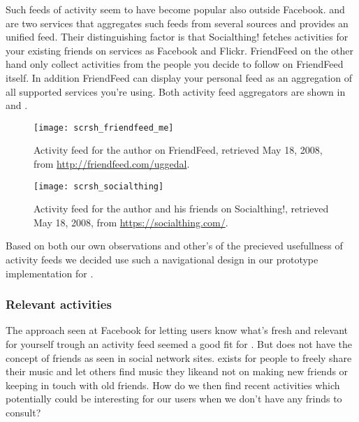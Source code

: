 Such feeds of activity seem to have become popular also outside Facebook.
 and  are two services that
aggregates such feeds from several sources and provides an unified feed. Their
distinguishing factor is that Socialthing! fetches activities for your
existing friends on services as Facebook and Flickr. FriendFeed on the other
hand only collect activities from the people you decide to follow on
FriendFeed itself. In addition FriendFeed can display your personal feed
as an aggregation of all supported services you're using. Both activity feed
aggregators are shown in  and
.

\begin{figure}
  \begin{whole}
    \texttt{[image: scrsh\_friendfeed\_me]}
    \caption[FriendFeed Activity Feed]{
      Activity feed for the author on FriendFeed,
      retrieved May 18, 2008, from
      \url{http://friendfeed.com/uggedal}.
    }
    \label{figure:scrsh.friendfeed.me}
  \end{whole}
\end{figure}

\begin{figure}
  \begin{whole}
    \texttt{[image: scrsh\_socialthing]}
    \caption[Socialthing! Activity Feed]{
      Activity feed for the author and his friends on Socialthing!,
      retrieved May 18, 2008, from
      \url{https://socialthing.com/}.
    }
    \label{figure:scrsh.socialthing}
  \end{whole}
\end{figure}

Based on both our own observations and other's of the precieved
usefullness of activity feeds we decided use such a navigational design in our
prototype implementation for \urort{}.

\subsubsection{Relevant activities}

The approach seen at Facebook for letting users know what's fresh and relevant
for yourself trough an activity feed seemed a good fit for \urort{}. But
\urort{} does not have the concept of friends as seen in social network sites.
\urort{} exists for people to freely share their music and let others find
music they like\dash{}and not on making new friends or keeping in touch with
old friends. How do we then find recent activities which potentially could be
interesting for our users when we don't have any frinds to consult?

